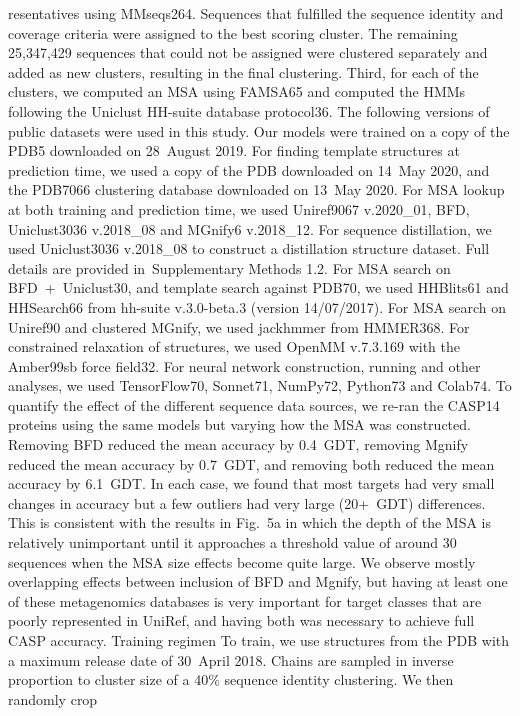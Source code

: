 resentatives using MMseqs264. Sequences that fulfilled the sequence
identity and coverage criteria were assigned to the best scoring cluster.
The remaining 25,347,429 sequences that could not be assigned were
clustered separately and added as new clusters, resulting in the final
clustering. Third, for each of the clusters, we computed an MSA using
FAMSA65 and computed the HMMs following the Uniclust HH-suite
database protocol36.
The following versions of public datasets were used in this study. Our
models were trained on a copy of the PDB5 downloaded on 28 August
2019. For finding template structures at prediction time, we used a copy
of the PDB downloaded on 14 May 2020, and the PDB7066 clustering
database downloaded on 13 May 2020. For MSA lookup at both training
and prediction time, we used Uniref9067 v.2020\_01, BFD, Uniclust3036
v.2018\_08 and MGnify6 v.2018\_12. For sequence distillation, we used
Uniclust3036 v.2018\_08 to construct a distillation structure dataset.
Full details are provided in Supplementary Methods 1.2.
For MSA search on BFD + Uniclust30, and template search against
PDB70, we used HHBlits61 and HHSearch66 from hh-suite v.3.0-beta.3
(version 14/07/2017). For MSA search on Uniref90 and clustered MGnify,
we used jackhmmer from HMMER368. For constrained relaxation of
structures, we used OpenMM v.7.3.169 with the Amber99sb force field32.
For neural network construction, running and other analyses, we used
TensorFlow70, Sonnet71, NumPy72, Python73 and Colab74.
To quantify the effect of the different sequence data sources, we
re-ran the CASP14 proteins using the same models but varying how the
MSA was constructed. Removing BFD reduced the mean accuracy by
0.4 GDT, removing Mgnify reduced the mean accuracy by 0.7 GDT, and
removing both reduced the mean accuracy by 6.1 GDT. In each case, we
found that most targets had very small changes in accuracy but a few
outliers had very large (20+ GDT) differences. This is consistent with the
results in Fig. 5a in which the depth of the MSA is relatively unimportant
until it approaches a threshold value of around 30 sequences when the
MSA size effects become quite large. We observe mostly overlapping
effects between inclusion of BFD and Mgnify, but having at least one
of these metagenomics databases is very important for target classes
that are poorly represented in UniRef, and having both was necessary
to achieve full CASP accuracy.
Training regimen
To train, we use structures from the PDB with a maximum release date
of 30 April 2018. Chains are sampled in inverse proportion to cluster
size of a 40\% sequence identity clustering. We then randomly crop
